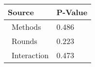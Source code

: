 
\centering
\begin{tabular}{ll}
\toprule
          Source & P-Value \\
\midrule
    \    Methods &   0.486 \\
     \    Rounds &   0.223 \\
\    Interaction &   0.473 \\
\bottomrule
\end{tabular}
